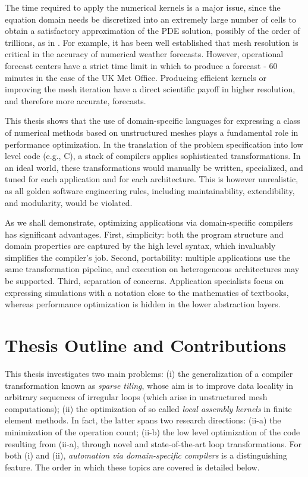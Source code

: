 The time required to apply the numerical kernels is a major issue, since the equation domain needs be discretized into an extremely large number of cells to obtain a satisfactory approximation of the PDE solution, possibly of the order of trillions, as in \cite{Rossinelli2013}. For example, it has been well established that mesh resolution is critical in the accuracy of numerical weather forecasts. However, operational forecast centers have a strict time limit in which to produce a forecast - 60 minutes in the case of the UK Met Office. Producing efficient kernels or improving the mesh iteration have a direct scientific payoff in higher resolution, and therefore more accurate, forecasts. 

This thesis shows that the use of domain-specific languages for expressing a class of numerical methods based on unstructured meshes plays a fundamental role in performance optimization. In the translation of the problem specification into low level code (e.g., C), a stack of compilers applies sophisticated transformations. In an ideal world, these transformations would manually be written, specialized, and tuned for each application and for each architecture. This is however unrealistic, as all golden software engineering rules, including maintainability, extendibility, and modularity, would be violated.

As we shall demonstrate, optimizing applications via domain-specific compilers has significant advantages. First, simplicity: both the program structure and domain properties are captured by the high level syntax, which invaluably simplifies the compiler's job. Second, portability: multiple applications use the same transformation pipeline, and execution on heterogeneous architectures may be supported. Third, separation of concerns. Application specialists focus on expressing simulations with a notation close to the mathematics of textbooks, whereas performance optimization is hidden in the lower abstraction layers. 

\section{Thesis Outline and Contributions}
\label{sec:contributions}
This thesis investigates two main problems: (i) the generalization of a compiler transformation known as {\em sparse tiling}, whose aim is to improve data locality in arbitrary sequences of irregular loops (which arise in unstructured mesh computations); (ii) the optimization of so called {\em local assembly kernels} in finite element methods. In fact, the latter spans two research directions: (ii-a) the minimization of the operation count; (ii-b) the low level optimization of the code resulting from (ii-a), through novel and state-of-the-art loop transformations. For both (i) and (ii), {\it automation via domain-specific compilers} is a distinguishing feature. The order in which these topics are covered is detailed below.

